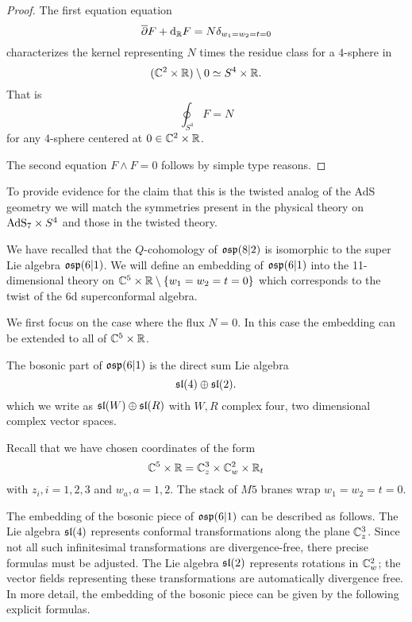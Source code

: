 \begin{proof}
The first equation equation 
\[
\overline{\partial} F + {\rm d}_{\mathbb R} F = N \delta_{w_1=w_2=t=0}
\]
characterizes the kernel representing $N$ times the residue class for a $4$-sphere in 
\[
(\mathbb C^2 \times \mathbb R) \setminus 0 \simeq S^4 \times \mathbb R .
\] 
That is
\[
\oint_{S^4} F = N 
\]
for any $4$-sphere centered at $0 \in \mathbb C^2 \times \mathbb R$.

The second equation $F \wedge F = 0$ follows by simple type reasons. 
\end{proof}

\parsec[]

To provide evidence for the claim that this is the twisted analog of the AdS geometry we will match the symmetries present in the physical theory on ${\rm AdS}_7 \times S^4$ and those in the twisted theory. 

We have recalled that the $Q$-cohomology of $\mathfrak{osp}(8|2)$ is isomorphic to the super Lie algebra $\mathfrak{osp}(6|1)$. 
We will define an embedding of $\mathfrak{osp}(6|1)$ into the 11-dimensional theory on $\mathbb C^5 \times \mathbb R \setminus \{w_1=w_2=t=0\}$ which corresponds to the twist of the 6d superconformal algebra.

We first focus on the case where the flux $N=0$.
In this case the embedding can be extended to all of $\mathbb C^5 \times \mathbb R$. 

The bosonic part of $\mathfrak{osp}(6|1)$ is the direct sum Lie algebra
\[
\mathfrak{sl}(4) \oplus \mathfrak{sl}(2) .
\]
which we write as $\mathfrak{sl}(W) \oplus \mathfrak{sl}(R)$ with $W,R$ complex four, two dimensional complex vector spaces. 

Recall that we have chosen coordinates of the form
\[
\mathbb C^5 \times \mathbb R = \mathbb C_z^3 \times \mathbb C_w^2 \times \mathbb R_t
\]
with $z_i, i=1,2,3$ and $w_a, a=1,2$.
The stack of $M5$ branes wrap $w_1=w_2=t=0$. 

The embedding of the bosonic piece of $\mathfrak{osp}(6|1)$ can be described as follows. 
The Lie algebra $\mathfrak{sl}(4)$ represents conformal transformations along the plane $\mathbb C^3_z$.
Since not all such infinitesimal transformations are divergence-free, there precise formulas must be adjusted.   
The Lie algebra $\mathfrak{sl}(2)$ represents rotations in $\mathbb C^2_w$; the vector fields representing these transformations are automatically divergence free.
In more detail, the embedding of the bosonic piece can be given by the following explicit formulas. 

